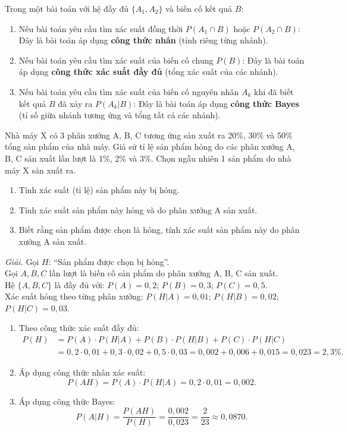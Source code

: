 \begin{chuy}
Trong một bài toán với hệ đầy đủ $\{A_1, A_2\}$ và biến cố kết quả $B$:
\begin{enumerate}[label=\arabic*)]
    \item Nếu bài toán yêu cầu tìm xác suất đồng thời $P(A_1 \cap B)$ hoặc $P(A_2 \cap B)$: Đây là bài toán áp dụng \textbf{công thức nhân} (tính riêng từng nhánh).
    \item Nếu bài toán yêu cầu tìm xác suất của biến cố chung $P(B)$: Đây là bài toán áp dụng \textbf{công thức xác suất đầy đủ} (tổng xác suất của các nhánh).
    \item Nếu bài toán yêu cầu tìm xác suất của biến cố nguyên nhân $A_k$ khi đã biết kết quả $B$ đã xảy ra $P(A_k|B)$: Đây là bài toán áp dụng \textbf{công thức Bayes} (tỉ số giữa nhánh tương ứng và tổng tất cả các nhánh).
\end{enumerate}
\end{chuy}

\begin{vidu}
Nhà máy X có 3 phân xưởng A, B, C tương ứng sản xuất ra 20\%, 30\% và 50\% tổng sản phẩm của nhà máy. Giả sử tỉ lệ sản phẩm hỏng do các phân xưởng A, B, C sản xuất lần lượt là 1\%, 2\% và 3\%. Chọn ngẫu nhiên 1 sản phẩm do nhà máy X sản xuất ra.
\begin{enumerate}[label=\arabic*)]
    \item Tính xác suất (tỉ lệ) sản phẩm này bị hỏng.
    \item Tính xác suất sản phẩm này hỏng và do phân xưởng A sản xuất.
    \item Biết rằng sản phẩm được chọn là hỏng, tính xác suất sản phẩm này do phân xưởng A sản xuất.
\end{enumerate}
\textit{Giải.} Gọi $H$: ``Sản phẩm được chọn bị hỏng''.\\
Gọi $A, B, C$ lần lượt là biến cố sản phẩm do phân xưởng A, B, C sản xuất.\\
Hệ $\{A, B, C\}$ là đầy đủ với: $P(A) = 0{,}2$; $P(B) = 0{,}3$; $P(C) = 0{,}5$.\\
Xác suất hỏng theo từng phân xưởng: $P(H|A) = 0{,}01$; $P(H|B) = 0{,}02$; $P(H|C) = 0{,}03$.
\begin{enumerate}[label=\arabic*)]
    \item Theo công thức xác suất đầy đủ:
    \begin{align*}
    P(H) &= P(A) \cdot P(H|A) + P(B) \cdot P(H|B) + P(C) \cdot P(H|C) \\
         &= 0{,}2 \cdot 0{,}01 + 0{,}3 \cdot 0{,}02 + 0{,}5 \cdot 0{,}03 = 0{,}002 + 0{,}006 + 0{,}015 = 0{,}023 = 2{,}3\%.
    \end{align*}
    \item Áp dụng công thức nhân xác suất:
    \[
    P(AH) = P(A) \cdot P(H|A) = 0{,}2 \cdot 0{,}01 = 0{,}002.
    \]
    \item Áp dụng công thức Bayes:
    \[
    P(A|H) = \frac{P(AH)}{P(H)} = \frac{0{,}002}{0{,}023} = \frac{2}{23} \approx 0{,}0870.
    \]
\end{enumerate}
\end{vidu}

